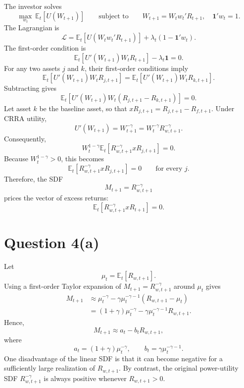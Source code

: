 The investor solves
\[
\max_{w_t}\ \mathbb{E}_t[U(W_{t+1})]
\qquad\text{subject to}\qquad
W_{t+1}=W_t w_t'R_{t+1},
\quad
\mathbf{1}'w_t=1.
\]
The Lagrangian is
\[
\mathcal{L}
=\mathbb{E}_t\!\left[U\!\left(W_t w_t'R_{t+1}\right)\right]
+\lambda_t(1-\mathbf{1}'w_t).
\]
The first-order condition is
\[
\mathbb{E}_t\!\left[U'(W_{t+1})W_tR_{t+1}\right]
-\lambda_t\mathbf{1}=0.
\]
For any two assets $j$ and $k$, their first-order conditions imply
\[
\mathbb{E}_t\!\left[U'(W_{t+1})W_tR_{j,t+1}\right]
=
\mathbb{E}_t\!\left[U'(W_{t+1})W_tR_{k,t+1}\right].
\]
Subtracting gives
\[
\mathbb{E}_t\!\left[
U'(W_{t+1})W_t(R_{j,t+1}-R_{k,t+1})
\right]=0.
\]
Let asset $k$ be the baseline asset, so that
$xR_{j,t+1}=R_{j,t+1}-R_{f,t+1}$. Under CRRA utility,
\[
U'(W_{t+1})=W_{t+1}^{-\gamma}
=W_t^{-\gamma}R_{w,t+1}^{-\gamma}.
\]
Consequently,
\[
W_t^{1-\gamma}
\mathbb{E}_t\!\left[R_{w,t+1}^{-\gamma}xR_{j,t+1}\right]=0.
\]
Because $W_t^{1-\gamma}>0$, this becomes
\[
\mathbb{E}_t\!\left[R_{w,t+1}^{-\gamma}xR_{j,t+1}\right]=0
\qquad\text{for every }j.
\]
Therefore, the SDF
\[
M_{t+1}=R_{w,t+1}^{-\gamma}
\]
prices the vector of excess returns:
\[
\mathbb{E}_t\!\left[R_{w,t+1}^{-\gamma}xR_{t+1}\right]=0.
\]

\section*{Question 4(a)}

Let
\[
\mu_t=\mathbb{E}_t[R_{w,t+1}].
\]
Using a first-order Taylor expansion of
$M_{t+1}=R_{w,t+1}^{-\gamma}$ around $\mu_t$ gives
\begin{align*}
M_{t+1}
&\approx
\mu_t^{-\gamma}
-\gamma\mu_t^{-\gamma-1}(R_{w,t+1}-\mu_t) \\
&=(1+\gamma)\mu_t^{-\gamma}
-\gamma\mu_t^{-\gamma-1}R_{w,t+1}.
\end{align*}
Hence,
\[
M_{t+1}\approx a_t-b_tR_{w,t+1},
\]
where
\[
a_t=(1+\gamma)\mu_t^{-\gamma},
\qquad
b_t=\gamma\mu_t^{-\gamma-1}.
\]
One disadvantage of the linear SDF is that it can become negative for a
sufficiently large realization of $R_{w,t+1}$. By contrast, the original
power-utility SDF $R_{w,t+1}^{-\gamma}$ is always positive whenever
$R_{w,t+1}>0$.
